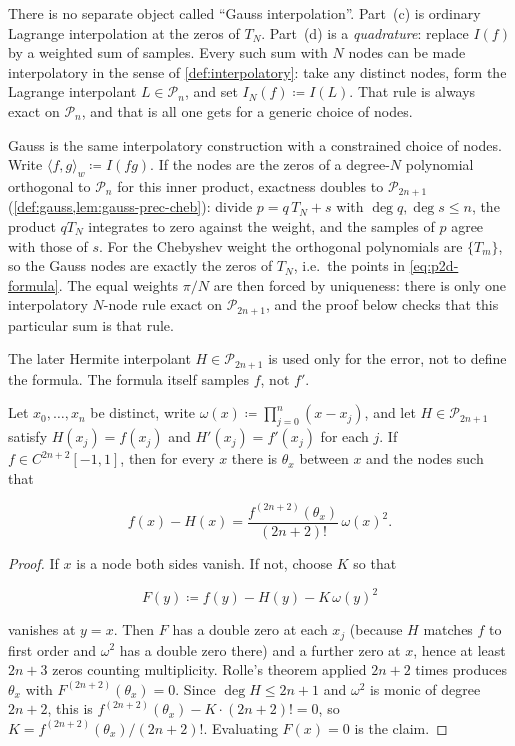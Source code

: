 \begin{remark}
\label{rem:why-gauss}
There is no separate object called ``Gauss interpolation''. Part~(c) is ordinary Lagrange interpolation at the zeros of \(T_{N}\). Part~(d) is a \emph{quadrature}: replace \(I(f)\) by a weighted sum of samples. Every such sum with \(N\) nodes can be made interpolatory in the sense of \cref{def:interpolatory}: take any distinct nodes, form the Lagrange interpolant \(L\in\mathcal{P}_{n}\), and set \(I_{N}(f)\coloneqq I(L)\). That rule is always exact on \(\mathcal{P}_{n}\), and that is all one gets for a generic choice of nodes.

Gauss is the same interpolatory construction with a constrained choice of nodes. Write \(\langle f,g\rangle_{w}\coloneqq I(fg)\). If the nodes are the zeros of a degree-\(N\) polynomial orthogonal to \(\mathcal{P}_{n}\) for this inner product, exactness doubles to \(\mathcal{P}_{2n+1}\) (\cref{def:gauss,lem:gauss-prec-cheb}): divide \(p=q\,T_{N}+s\) with \(\deg q,\deg s\le n\), the product \(qT_{N}\) integrates to zero against the weight, and the samples of \(p\) agree with those of \(s\). For the Chebyshev weight the orthogonal polynomials are \(\{T_{m}\}\), so the Gauss nodes are exactly the zeros of \(T_{N}\), i.e.\ the points in \eqref{eq:p2d-formula}. The equal weights \(\pi/N\) are then forced by uniqueness: there is only one interpolatory \(N\)-node rule exact on \(\mathcal{P}_{2n+1}\), and the proof below checks that this particular sum is that rule.

The later Hermite interpolant \(H\in\mathcal{P}_{2n+1}\) is used only for the error, not to define the formula. The formula itself samples \(f\), not \(f'\).
\end{remark}

\begin{lemma}
\label{lem:p2d-hermite}
Let \(x_{0},\ldots,x_{n}\) be distinct, write \(\omega(x)\coloneqq\prod_{j=0}^{n}(x-x_{j})\), and let \(H\in\mathcal{P}_{2n+1}\) satisfy \(H(x_{j})=f(x_{j})\) and \(H'(x_{j})=f'(x_{j})\) for each \(j\). If \(f\in C^{2n+2}[-1,1]\), then for every \(x\) there is \(\theta_{x}\) between \(x\) and the nodes such that

\[
f(x)-H(x)
=
\frac{f^{(2n+2)}(\theta_{x})}{(2n+2)!}\,\omega(x)^{2}.
\]
\end{lemma}

\begin{proof}
If \(x\) is a node both sides vanish. If not, choose \(K\) so that

\[
F(y)
\coloneqq
f(y)-H(y)-K\,\omega(y)^{2}
\]

vanishes at \(y=x\). Then \(F\) has a double zero at each \(x_{j}\) (because \(H\) matches \(f\) to first order and \(\omega^{2}\) has a double zero there) and a further zero at \(x\), hence at least \(2n+3\) zeros counting multiplicity. Rolle's theorem applied \(2n+2\) times produces \(\theta_{x}\) with \(F^{(2n+2)}(\theta_{x})=0\). Since \(\deg H\le 2n+1\) and \(\omega^{2}\) is monic of degree \(2n+2\), this is \(f^{(2n+2)}(\theta_{x})-K\cdot(2n+2)! =0\), so \(K=f^{(2n+2)}(\theta_{x})/(2n+2)!\). Evaluating \(F(x)=0\) is the claim.
\end{proof}

